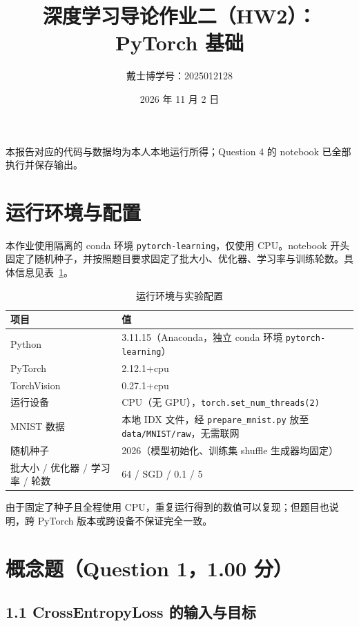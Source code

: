 \documentclass[11pt,a4paper]{ctexart}
\title{\heiti 深度学习导论\quad 作业二（HW2）：PyTorch 基础}
\author{戴士博\quad 学号：2025012128}
\date{2026 年 11 月 2 日}
\begin{document}
\maketitle
\vspace{-1.2em}
\begin{center}
\small 本报告对应的代码与数据均为本人本地运行所得；Question 4 的 notebook 已全部执行并保存输出。
\end{center}

\section{运行环境与配置}

本作业使用隔离的 conda 环境 \texttt{pytorch-learning}，仅使用 CPU。notebook 开头固定了随机种子，并按照题目要求固定了批大小、优化器、学习率与训练轮数。具体信息见表~\ref{tab:env}。

\begin{table}[H]
\centering
\caption{运行环境与实验配置}
\label{tab:env}
\begin{tabular}{p{6.0cm}p{9.2cm}}
\toprule
项目 & 值 \\
\midrule
Python & 3.11.15（Anaconda，独立 conda 环境 \texttt{pytorch-learning}） \\
PyTorch & 2.12.1+cpu \\
TorchVision & 0.27.1+cpu \\
运行设备 & CPU（无 GPU），\texttt{torch.set\_num\_threads(2)} \\
MNIST 数据 & 本地 IDX 文件，经 \texttt{prepare\_mnist.py} 放至 \texttt{data/MNIST/raw}，无需联网 \\
随机种子 & 2026（模型初始化、训练集 shuffle 生成器均固定） \\
批大小 / 优化器 / 学习率 / 轮数 & 64 / SGD / 0.1 / 5 \\
\bottomrule
\end{tabular}
\end{table}

由于固定了种子且全程使用 CPU，重复运行得到的数值可以复现；但题目也说明，跨 PyTorch 版本或跨设备不保证完全一致。

\section{概念题（Question 1，1.00 分）}

\subsection{1.1 CrossEntropyLoss 的输入与目标}
\end{document}
